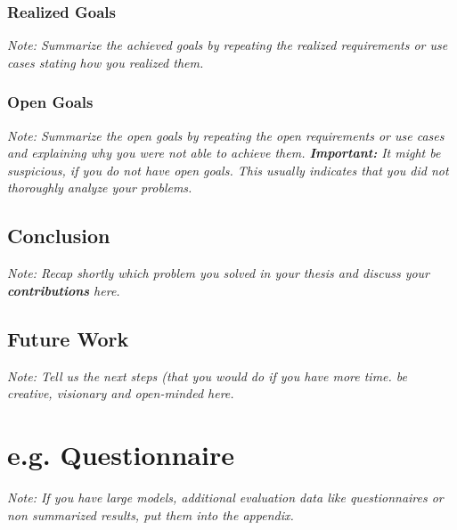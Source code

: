 \documentclass[a4paper,12pt,twoside]{report}
\begin{document}
\subsection{Realized Goals}

\textit{Note: Summarize the achieved goals by repeating the realized requirements or use cases stating how you realized them.}

\subsection{Open Goals}

\textit{Note: Summarize the open goals by repeating the open requirements or use cases and explaining why you were not able to achieve them. \textbf{Important:} It might be suspicious, if you do not have open goals. This usually indicates that you did not thoroughly analyze your problems.}

\section{Conclusion}

\textit{Note: Recap shortly which problem you solved in your thesis and discuss your \textbf{contributions} here.}

\section{Future Work}

\textit{Note: Tell us the next steps  (that you would do if you have more time. be creative, visionary and open-minded here.}



\appendix

\chapter{e.g. Questionnaire}

\textit{Note: If you have large models, additional evaluation data like questionnaires or non summarized results, put them into the appendix.}


\clearpage

\listoffigures
\clearpage

\listoftables
\clearpage



\end{document}
